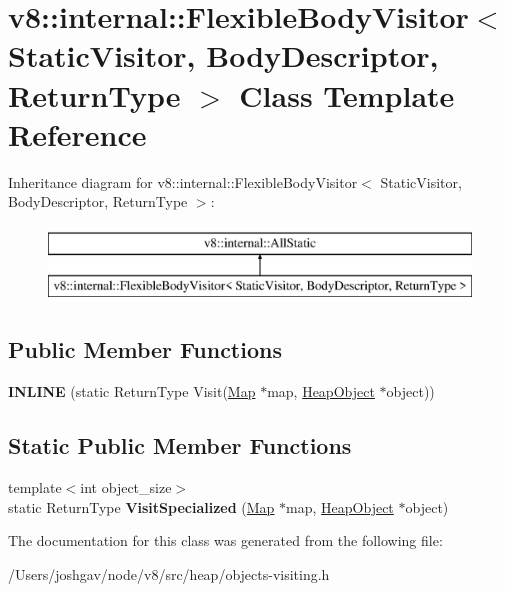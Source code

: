 \hypertarget{classv8_1_1internal_1_1_flexible_body_visitor}{}\section{v8\+:\+:internal\+:\+:Flexible\+Body\+Visitor$<$ Static\+Visitor, Body\+Descriptor, Return\+Type $>$ Class Template Reference}
\label{classv8_1_1internal_1_1_flexible_body_visitor}
Inheritance diagram for v8\+:\+:internal\+:\+:Flexible\+Body\+Visitor$<$ Static\+Visitor, Body\+Descriptor, Return\+Type $>$\+:\begin{figure}[H]
\begin{center}
\leavevmode
\includegraphics[height=2.000000cm]{classv8_1_1internal_1_1_flexible_body_visitor}
\end{center}
\end{figure}
\subsection*{Public Member Functions}
\begin{DoxyCompactItemize}
\item 
{\bfseries I\+N\+L\+I\+NE} (static Return\+Type Visit(\hyperlink{classv8_1_1internal_1_1_map}{Map} $\ast$map, \hyperlink{classv8_1_1internal_1_1_heap_object}{Heap\+Object} $\ast$object))\hypertarget{classv8_1_1internal_1_1_flexible_body_visitor_a706c716d8ac773f1548efa982c24ecac}{}\label{classv8_1_1internal_1_1_flexible_body_visitor_a706c716d8ac773f1548efa982c24ecac}

\end{DoxyCompactItemize}
\subsection*{Static Public Member Functions}
\begin{DoxyCompactItemize}
\item 
{\footnotesize template$<$int object\+\_\+size$>$ }\\static Return\+Type {\bfseries Visit\+Specialized} (\hyperlink{classv8_1_1internal_1_1_map}{Map} $\ast$map, \hyperlink{classv8_1_1internal_1_1_heap_object}{Heap\+Object} $\ast$object)\hypertarget{classv8_1_1internal_1_1_flexible_body_visitor_a989b7e32d86e6dbc6eb9043180eaeba9}{}\label{classv8_1_1internal_1_1_flexible_body_visitor_a989b7e32d86e6dbc6eb9043180eaeba9}

\end{DoxyCompactItemize}


The documentation for this class was generated from the following file\+:\begin{DoxyCompactItemize}
\item 
/\+Users/joshgav/node/v8/src/heap/objects-\/visiting.\+h\end{DoxyCompactItemize}
